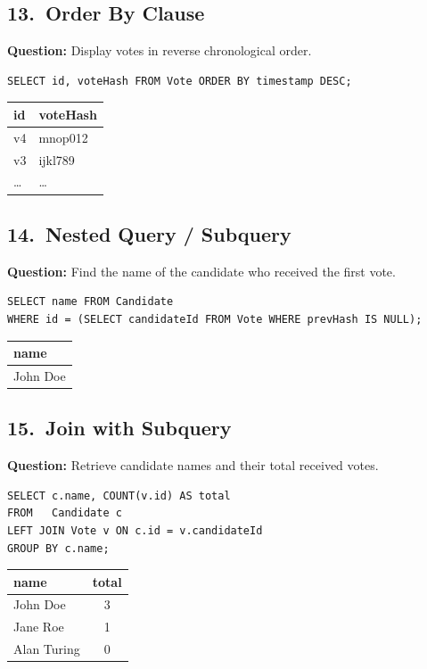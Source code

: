 \documentclass[12pt, a4paper]{article}
\begin{document}
\subsection{13.\ Order By Clause}
\textbf{Question:} Display votes in reverse chronological order.
\begin{lstlisting}
SELECT id, voteHash FROM Vote ORDER BY timestamp DESC;
\end{lstlisting}
\begin{center}
\begin{tabular}{|>{\ttfamily}l|>{\ttfamily}l|}
\hline
\textbf{id} & \textbf{voteHash} \\ \hline
v4 & mnop012 \\
v3 & ijkl789 \\
\ldots & \ldots \\ \hline
\end{tabular}
\end{center}

\subsection{14.\ Nested Query / Subquery}
\textbf{Question:} Find the name of the candidate who received the first vote.
\begin{lstlisting}
SELECT name FROM Candidate
WHERE id = (SELECT candidateId FROM Vote WHERE prevHash IS NULL);
\end{lstlisting}
\begin{center}
\begin{tabular}{|l|}
\hline
\textbf{name} \\ \hline
John Doe \\ \hline
\end{tabular}
\end{center}

\subsection{15.\ Join with Subquery}
\textbf{Question:} Retrieve candidate names and their total received votes.
\begin{lstlisting}
SELECT c.name, COUNT(v.id) AS total
FROM   Candidate c
LEFT JOIN Vote v ON c.id = v.candidateId
GROUP BY c.name;
\end{lstlisting}
\begin{center}
\begin{tabular}{|l|c|}
\hline
\textbf{name} & \textbf{total} \\ \hline
John Doe    & 3 \\
Jane Roe    & 1 \\
Alan Turing & 0 \\ \hline
\end{tabular}
\end{center}
\end{document}

